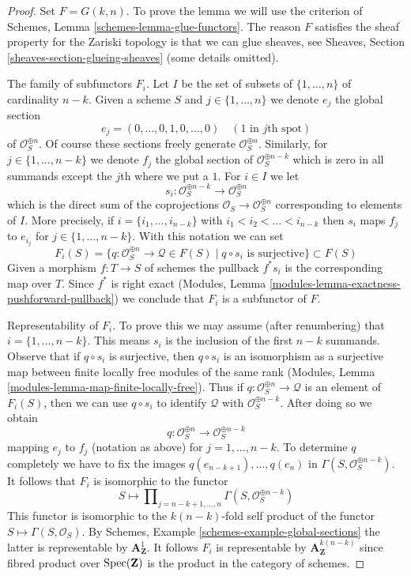 \begin{proof}
Set $F = G(k, n)$. To prove the lemma we will use the criterion of
Schemes, Lemma \ref{schemes-lemma-glue-functors}.
The reason $F$ satisfies the sheaf property for the
Zariski topology is that we can glue sheaves, see Sheaves,
Section \ref{sheaves-section-glueing-sheaves} (some details omitted).

\medskip\noindent
The family of subfunctors $F_i$.
Let $I$ be the set of subsets of $\{1, \ldots, n\}$ of cardinality $n - k$.
Given a scheme $S$ and $j \in \{1, \ldots, n\}$ we denote $e_j$
the global section
$$
e_j = (0, \ldots, 0, 1, 0, \ldots, 0)\quad(1\text{ in }j\text{th spot})
$$
of $\mathcal{O}_S^{\oplus n}$. Of course these sections freely generate
$\mathcal{O}_S^{\oplus n}$. Similarly, for $j \in \{1, \ldots, n - k\}$
we denote $f_j$ the global section of $\mathcal{O}_S^{\oplus n - k}$
which is zero in all summands except the $j$th where we put a $1$.
For $i \in I$ we let
$$
s_i : \mathcal{O}_S^{\oplus n - k} \longrightarrow \mathcal{O}_S^{\oplus n}
$$
which is the direct sum of the coprojections
$\mathcal{O}_S \to \mathcal{O}_S^{\oplus n}$ corresponding to elements of $I$.
More precisely, if $i = \{i_1, \ldots, i_{n - k}\}$ with
$i_1 < i_2 < \ldots < i_{n - k}$
then $s_i$ maps $f_j$ to $e_{i_j}$ for $j \in \{1, \ldots, n - k\}$.
With this notation we can set
$$
F_i(S) = \{q : \mathcal{O}_S^{\oplus n} \to \mathcal{Q} \in F(S) \mid
q \circ s_i \text{ is surjective}\}
\subset F(S)
$$
Given a morphism $f : T \to S$ of schemes the pullback $f^*s_i$
is the corresponding map over $T$. Since $f^*$ is right exact
(Modules, Lemma \ref{modules-lemma-exactness-pushforward-pullback})
we conclude that $F_i$ is a subfunctor of $F$.

\medskip\noindent
Representability of $F_i$. To prove this we may assume (after renumbering)
that $i = \{1, \ldots, n - k\}$. This means $s_i$ is the inclusion of
the first $n - k$ summands. Observe that if $q \circ s_i$ is surjective,
then $q \circ s_i$ is an isomorphism as a surjective map between finite
locally free modules of the same rank
(Modules, Lemma \ref{modules-lemma-map-finite-locally-free}).
Thus if $q : \mathcal{O}_S^{\oplus n} \to \mathcal{Q}$ is an element of
$F_i(S)$, then we can use $q \circ s_i$ to identify $\mathcal{Q}$ with
$\mathcal{O}_S^{\oplus n - k}$. After doing so we obtain
$$
q : \mathcal{O}_S^{\oplus n} \longrightarrow \mathcal{O}_S^{\oplus n - k}
$$
mapping $e_j$ to $f_j$ (notation as above) for $j = 1, \ldots, n - k$.
To determine $q$ completely we have to fix the images
$q(e_{n - k + 1}), \ldots, q(e_n)$ in
$\Gamma(S, \mathcal{O}_S^{\oplus n - k})$.
It follows that $F_i$ is isomorphic to the functor
$$
S \longmapsto
\prod\nolimits_{j = n - k + 1, \ldots, n}
\Gamma(S,  \mathcal{O}_S^{\oplus n - k})
$$
This functor is isomorphic to the $k(n - k)$-fold self product of the functor
$S \mapsto \Gamma(S, \mathcal{O}_S)$. By
Schemes, Example \ref{schemes-example-global-sections}
the latter is representable by $\mathbf{A}^1_\mathbf{Z}$. It follows $F_i$
is representable by $\mathbf{A}^{k(n - k)}_\mathbf{Z}$ since fibred product
over $\mathop{\mathrm{Spec}}(\mathbf{Z})$ is the product in the category of schemes.


\end{proof}
